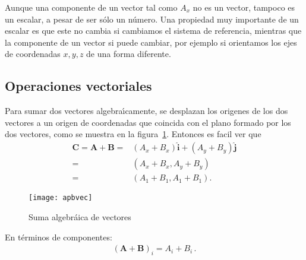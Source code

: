 \begin{frame}
Aunque una componente de un vector tal como $A_x$ no es un vector, tampoco es un escalar, a pesar de ser sólo un número. Una propiedad muy importante de un escalar es que este no cambia si cambiamos el sistema de referencia, mientras que la componente de un vector si puede cambiar, por ejemplo si orientamos los ejes de coordenadas $x, y, z$ de una forma diferente.


\subsection{Operaciones vectoriales}

Para sumar dos vectores algebra\'\i camente, se desplazan los origenes de los dos vectores a un origen de coordenadas que coincida con el plano formado por los dos vectores, como se muestra en la figura~\ref{fig:apbvec}. Entonces es facil ver que
\begin{align}
  \mathbf{C}=\mathbf{A}+\mathbf{B}=&(A_x+B_x)\hat{\mathbf{i}}+(A_y+B_y)\hat{\mathbf{j}}\nonumber\\
  =&(A_x+B_x,A_y+B_y)\nonumber\\
  =&(A_1+B_1,A_1+B_1).
\end{align}

\begin{figure}
  \centering
  \texttt{[image: apbvec]}
  \caption{Suma algebráica de vectores}
\label{fig:apbvec}
\end{figure}
En t\'erminos de componentes:
\begin{align}
  \left(\mathbf{A}+\mathbf{B}\right)_i=A_i+B_i\,.
\end{align}
\end{frame}

